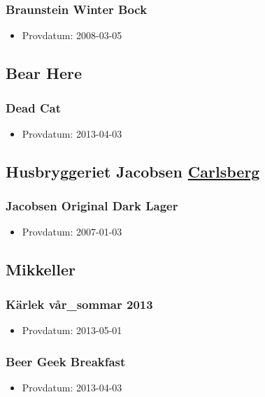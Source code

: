 \documentclass[11pt]{article}
\begin{document}
\subsubsection{Braunstein Winter Bock}
\label{sec:orgafd5e1a}
\begin{itemize}
\item Provdatum: 2008-03-05
\end{itemize}
\subsection{Bear Here}
\label{sec:orga7f141d}
\subsubsection{Dead Cat}
\label{sec:org9dad297}
\begin{itemize}
\item Provdatum: 2013-04-03
\end{itemize}
\subsection{Husbryggeriet Jacobsen \underline{Carlsberg}}
\label{sec:org9dd27f3}
\subsubsection{Jacobsen Original Dark Lager}
\label{sec:org9ac7208}
\begin{itemize}
\item Provdatum: 2007-01-03
\end{itemize}
\subsection{Mikkeller}
\label{sec:orgba572a3}
\subsubsection{Kärlek vår\_sommar 2013}
\label{sec:org575c479}
\begin{itemize}
\item Provdatum: 2013-05-01
\end{itemize}
\subsubsection{Beer Geek Breakfast}
\label{sec:org670bec3}
\begin{itemize}
\item Provdatum: 2013-04-03
\end{itemize}
\end{document}
